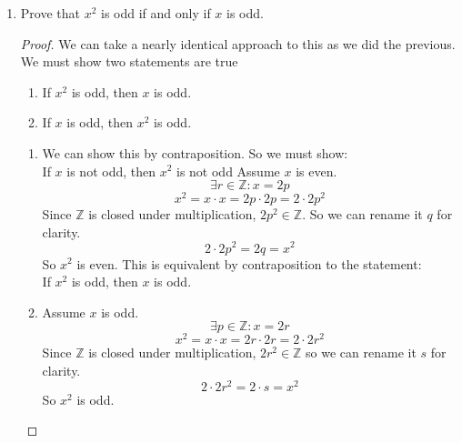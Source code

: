 \documentclass[12pt]{article}
\begin{document}
\begin{enumerate}
\begin{enumerate}
\begin{proof}
                By $i$ and $ii$, we have shown both cases and thus
                $x^2$ is even if and only if $x$ is even. \\

            \end{proof}

        \item Prove that $x^2$ is odd if and only if $x$ is odd. \\

            \begin{proof}
                We can take a nearly identical approach to this
                as we did the previous.
                We must show two statements are true
                \begin{enumerate}
                    \item If $x^2$ is odd, then $x$ is odd.
                    \item If $x$ is odd, then $x^2$ is odd.
                \end{enumerate}

                \begin{enumerate}
                    \item
                        We can show this by contraposition.
                        So we must show: \\
                        If $x$ is not odd, then $x^2$ is not odd
                        Assume $x$ is even.
                        \[\exists r \in \mathbb{Z} : x = 2p\]
                        \[
                            x^2 = x \cdot x = 2p \cdot 2p = 2 \cdot 2p^2
                        \]
                        Since $\mathbb{Z}$ is closed under multiplication,
                        $2p^2 \in \mathbb{Z}$.
                        So we can rename it $q$ for clarity.
                        \[2 \cdot 2p^2 = 2q = x^2\]
                        So $x^2$ is even.
                        This is equivalent by contraposition to the statement: \\
                        If $x^2$ is odd, then $x$ is odd.

                    \item
                        Assume $x$ is odd.
                        \[\exists p \in \mathbb{Z} : x = 2r\]
                        \[x^2 = x \cdot x = 2r \cdot 2r = 2 \cdot 2r^2\]
                        Since $\mathbb{Z}$ is closed under multiplication,
                        $2r^2 \in \mathbb{Z}$ so we can rename it $s$ for clarity.
                        \[2 \cdot 2r^2 = 2 \cdot s = x^2\]
                        So $x^2$ is odd.
                \end{enumerate}


\end{proof}
\end{enumerate}
\end{enumerate}
\end{document}
